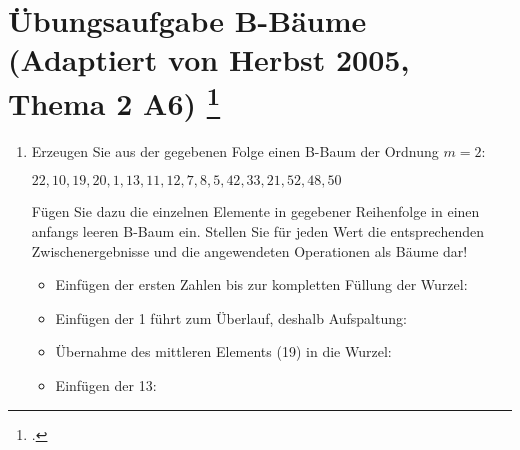 \documentclass{lehramt-informatik-haupt}
\begin{document}
\section{Übungsaufgabe B-Bäume
(Adaptiert von Herbst 2005, Thema 2 A6)
\footcite[Seite 34-37(PDF 28-31)]{aud:fs:5}}

\begin{enumerate}


\item Erzeugen Sie aus der gegebenen Folge einen B-Baum der Ordnung
$m=2$:

$22,10,19,20,1,13,11,12,7,8,5,42,33,21,52,48,50$

Fügen Sie dazu die einzelnen Elemente in gegebener Reihenfolge in einen
anfangs leeren B-Baum ein. Stellen Sie für jeden Wert die entsprechenden
Zwischenergebnisse und die angewendeten Operationen als Bäume dar!

\begin{itemize}

%

\item {}    Einfügen der ersten
Zahlen bis zur kompletten Füllung der Wurzel:


%

\item {} Einfügen der 1 führt zum Überlauf, deshalb Aufspaltung:


%

\item Übernahme des mittleren Elements (19) in die Wurzel:


%

\item {} Einfügen der 13:


\end{itemize}
\end{enumerate}
\end{document}
